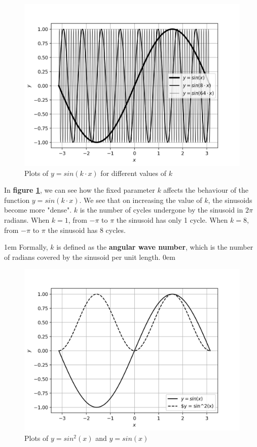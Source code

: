 \documentclass[12]{article}
\begin{document}
    \begin{figure}[H]
        \centering
        \includegraphics[width=\textwidth]{plots/q2p1.png}
        \caption{Plots of $y = sin(k\cdot x)$ for different values of $k$}
        \label{fig:q2p1}
    \end{figure}
    
    In \textbf{figure \ref{fig:q2p1}}, we can see how the fixed parameter $k$ affects the behaviour of the function $y = sin(k\cdot x)$. We see that on increasing the value of $k$, the sinusoids become more "dense". $k$ is the number of cycles undergone by the sinusoid in $2\pi$ radians. When $k = 1$, from $-\pi$ to $\pi$ the sinusoid has only 1 cycle. When $k = 8$, from $-\pi$ to $\pi$ the sinusoid has 8 cycles.
    
    \parskip 1em
    Formally, $k$ is defined as the \textbf{angular wave number}, which is the number of radians covered by the sinusoid per unit length.
    \parskip 0em
    
    \begin{figure}[H]
        \centering
        \includegraphics[width=\textwidth]{plots/q2p2.png}
        \caption{Plots of $y = sin^2(x)$ and $y = sin(x)$}
        \label{fig:q2p2}
    \end{figure}
    
\end{document}
